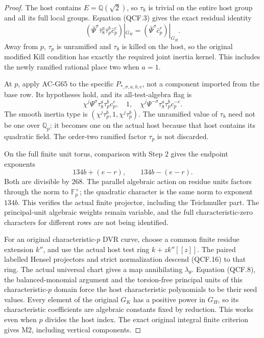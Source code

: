 \begin{proof}
The host contains \(E=\mathbb Q(\sqrt2)\), so \(\tau_8\)
is trivial on the entire host group and all its full local groups.
Equation (QCF.3) gives the exact residual identity
\[
 (\bar\Psi^\sigma\bar\tau_8^a\bar\tau_p^b\bar c_p^e)|_{G_H}
                  =(\bar\Psi^\sigma\bar c_p^r)|_{G_H}.
 \tag{QCF.15}
\]
Away from \(p\), \(\tau_p\) is unramified and \(\tau_8\)
is killed on the host, so the original modified Kill condition
has exactly the required joint inertia kernel.  This includes
the newly ramified rational place two when \(a=1\).

At \(p\), apply AC-G65 to the specific
\(P_{*,\sigma,a,b,e}\), not a component imported from the
base row.  Its hypotheses hold, and its all-test-algebra flag is
\[
 \chi^j\Psi^\sigma\tau_8^a\tau_p^bc_p^e,
       \quad1,\quad
 \chi^j\Psi^{-\sigma}\tau_8^a\tau_p^bc_p^{-e}.
 \tag{QCF.16}
\]
The smooth inertia type is \((\chi^j\tau_p^b,1,\chi^j\tau_p^b)\).
The unramified value of \(\tau_8\) need not be one over
\(\mathbb Q_p\); it becomes one on the actual host because
that host contains its quadratic field.  The order-two ramified
factor \(\tau_p\) is not discarded.

On the full finite unit torus, comparison with Step 2 gives
the endpoint exponents
\[
                     134b+(e-r),\qquad134b-(e-r).
 \tag{QCF.17}
\]
Both are divisible by \(268\).  The parallel algebraic action
on residue units factors through the norm to \(\mathbb F_p^\times\);
the quadratic character is the same norm to exponent \(134b\).
This verifies the actual finite projector, including the
Teichmuller part.  The principal-unit algebraic weights remain
variable, and the full characteristic-zero characters for different
rows are not being identified.

For an original characteristic-\(p\) DVR curve, choose a common
finite residue extension \(k''\), and use the actual host test
ring \(k+z k''[[z]]\).  The paired labelled Hensel projectors
and strict normalization descend (QCF.16) to that ring.  The
actual universal chart gives a map annihilating \(\lambda_\theta\).
Equation (QCF.8), the balanced-monomial argument and the torsion-free
principal units of this characteristic-\(p\) domain force the
host characteristic polynomials to be their seed values.
Every element of the original \(G_K\) has a positive power in
\(G_H\), so its characteristic coefficients are algebraic
constants fixed by reduction.  This works even when \(p\)
divides the host index.  The exact original integral finite
criterion gives M2, including vertical components.


\end{proof}
